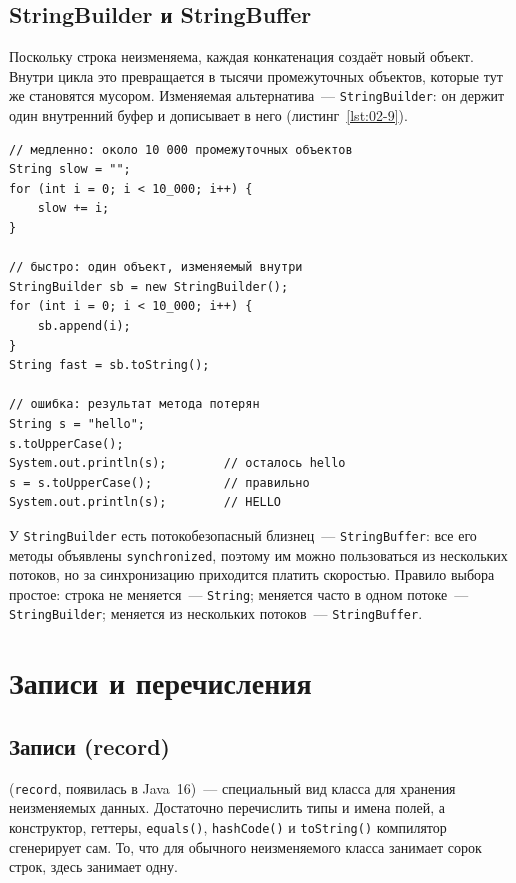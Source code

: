 \subsection{StringBuilder и StringBuffer}

Поскольку строка неизменяема, каждая конкатенация создаёт новый объект. Внутри
цикла это превращается в тысячи промежуточных объектов, которые тут же
становятся мусором. Изменяемая альтернатива~--- \texttt{StringBuilder}: он
держит один внутренний буфер и дописывает в него (листинг~\ref{lst:02-9}).

\begin{listing}[H]
\begin{verbatim}
// медленно: около 10 000 промежуточных объектов
String slow = "";
for (int i = 0; i < 10_000; i++) {
    slow += i;
}

// быстро: один объект, изменяемый внутри
StringBuilder sb = new StringBuilder();
for (int i = 0; i < 10_000; i++) {
    sb.append(i);
}
String fast = sb.toString();

// ошибка: результат метода потерян
String s = "hello";
s.toUpperCase();
System.out.println(s);        // осталось hello
s = s.toUpperCase();          // правильно
System.out.println(s);        // HELLO
\end{verbatim}
\caption{Конкатенация в цикле: String против StringBuilder}
\label{lst:02-9}
\end{listing}

У \texttt{StringBuilder} есть потокобезопасный близнец~---
\texttt{StringBuffer}: все его методы объявлены \texttt{synchronized}, поэтому
им можно пользоваться из нескольких потоков, но за синхронизацию приходится
платить скоростью. Правило выбора простое: строка не меняется~---
\texttt{String}; меняется часто в одном потоке~--- \texttt{StringBuilder};
меняется из нескольких потоков~--- \texttt{StringBuffer}.

\section{Записи и перечисления}

\subsection{Записи (record)}

 (\texttt{record}, появилась в Java~16)~--- специальный вид класса
для хранения неизменяемых данных. Достаточно перечислить типы и имена полей, а
конструктор, геттеры, \texttt{equals()}, \texttt{hashCode()} и
\texttt{toString()} компилятор сгенерирует сам. То, что для обычного
неизменяемого класса занимает сорок строк, здесь занимает одну.

